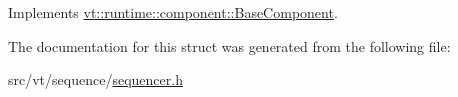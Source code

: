 Implements \hyperlink{structvt_1_1runtime_1_1component_1_1_base_component_a7701485f3539f78d42e6bad47fc7eb78}{vt\+::runtime\+::component\+::\+Base\+Component}.



The documentation for this struct was generated from the following file\+:\begin{DoxyCompactItemize}
\item 
src/vt/sequence/\hyperlink{sequencer_8h}{sequencer.\+h}\end{DoxyCompactItemize}
